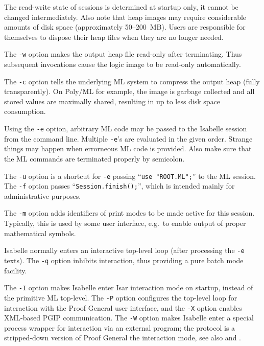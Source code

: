 \begin{isabellebody}
\begin{isamarkuptext}
  The read-write state of sessions is determined at startup only, it
  cannot be changed intermediately. Also note that heap images may
  require considerable amounts of disk space (approximately
  50--200~MB). Users are responsible for themselves to dispose their
  heap files when they are no longer needed.

  \medskip The \verb|-w| option makes the output heap file
  read-only after terminating.  Thus subsequent invocations cause the
  logic image to be read-only automatically.

  \medskip The \verb|-c| option tells the underlying ML system
  to compress the output heap (fully transparently).  On Poly/ML for
  example, the image is garbage collected and all stored values are
  maximally shared, resulting in up to  less disk space
  consumption.

  \medskip Using the \verb|-e| option, arbitrary ML code may be
  passed to the Isabelle session from the command line. Multiple
  \verb|-e|'s are evaluated in the given order. Strange things
  may happen when errorneous ML code is provided. Also make sure that
  the ML commands are terminated properly by semicolon.

  \medskip The \verb|-u| option is a shortcut for \verb|-e| passing ``\verb|use "ROOT.ML";|'' to the ML session.
  The \verb|-f| option passes ``\verb|Session.finish();|'', which is intended mainly for administrative
  purposes.

  \medskip The \verb|-m| option adds identifiers of print modes
  to be made active for this session. Typically, this is used by some
  user interface, e.g.\ to enable output of proper mathematical
  symbols.

  \medskip Isabelle normally enters an interactive top-level loop
  (after processing the \verb|-e| texts). The \verb|-q|
  option inhibits interaction, thus providing a pure batch mode
  facility.

  \medskip The \verb|-I| option makes Isabelle enter Isar
  interaction mode on startup, instead of the primitive ML top-level.
  The \verb|-P| option configures the top-level loop for
  interaction with the Proof General user interface, and the
  \verb|-X| option enables XML-based PGIP communication.  The
  \verb|-W| option makes Isabelle enter a special process
  wrapper for interaction via an external program; the protocol is a
  stripped-down version of Proof General the interaction mode, see
  also \hyperlink{file.~~/src/Pure/System/isabelle-process.ML}{\mbox{}} and \hyperlink{file.~~/src/Pure/System/isabelle-process.scala}{\mbox{}}.


\end{isamarkuptext}
\end{isabellebody}
